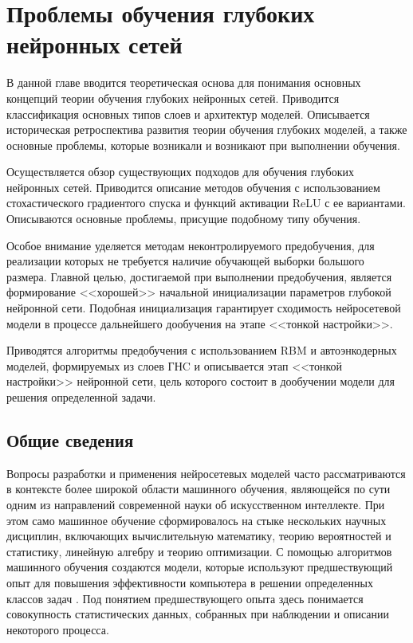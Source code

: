 \chapter{Проблемы обучения глубоких нейронных сетей}

В данной главе вводится теоретическая основа для понимания основных концепций теории обучения глубоких нейронных сетей. Приводится классификация основных типов слоев и архитектур моделей. Описывается историческая ретроспектива развития теории обучения глубоких моделей, а также основные проблемы, которые возникали и возникают при выполнении обучения. 

Осуществляется обзор существующих подходов для обучения глубоких нейронных сетей. Приводится описание методов обучения с использованием стохастического градиентого спуска и функций активации ReLU с ее вариантами. Описываются основные проблемы, присущие подобному типу обучения.

Особое внимание уделяется методам неконтролируемого предобучения, для реализации которых не требуется наличие обучающей выборки большого размера. Главной целью, достигаемой при выполнении предобучения, является формирование <<хорошей>> начальной инициализации параметров глубокой нейронной сети. Подобная инициализация гарантирует сходимость нейросетевой модели в процессе дальнейшего дообучения на этапе <<тонкой настройки>>.

Приводятся алгоритмы предобучения с использованием RBM и автоэнкодерных моделей, формируемых из слоев ГНC и описывается этап <<тонкой настройки>> нейронной сети, цель которого состоит в дообучении модели для решения определенной задачи.

\section{Общие сведения}

Вопросы разработки и применения нейросетевых моделей часто рассматриваются в контексте более широкой области машинного обучения, являющейся по сути одним из направлений современной науки об искусственном интеллекте. При этом само машинное обучение сформировалось на стыке нескольких научных дисциплин, включающих вычислительную математику, теорию вероятностей и статистику, линейную алгебру и теорию оптимизации. С помощью алгоритмов машинного обучения создаются модели, которые используют предшествующий опыт для повышения эффективности компьютера в решении определенных классов задач \cite{mitchell1997machine}. Под понятием предшествующего опыта здесь понимается совокупность статистических данных, собранных при наблюдении и описании некоторого процесса. 

